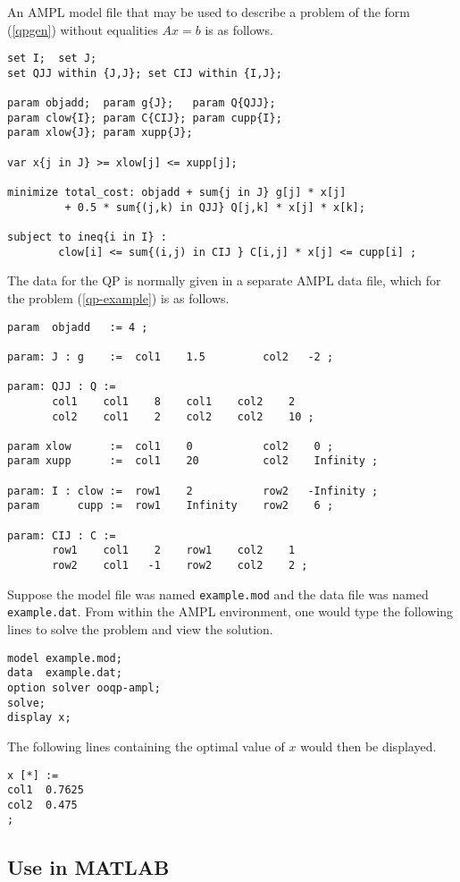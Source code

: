 An AMPL model file that may be used to describe a problem of the form
(\ref{qpgen}) without equalities $Ax=b$ is as follows.
\begin{verbatim}
set I;  set J;
set QJJ within {J,J}; set CIJ within {I,J};

param objadd;  param g{J};   param Q{QJJ};
param clow{I}; param C{CIJ}; param cupp{I};
param xlow{J}; param xupp{J};

var x{j in J} >= xlow[j] <= xupp[j];

minimize total_cost: objadd + sum{j in J} g[j] * x[j] 
         + 0.5 * sum{(j,k) in QJJ} Q[j,k] * x[j] * x[k];

subject to ineq{i in I} :
        clow[i] <= sum{(i,j) in CIJ } C[i,j] * x[j] <= cupp[i] ;
\end{verbatim}
The data for the QP is normally given in a separate AMPL data file,
which for the problem (\ref{qp-example}) is as follows.
\begin{verbatim}
param  objadd   := 4 ;

param: J : g    :=  col1    1.5         col2   -2 ;

param: QJJ : Q := 
       col1    col1    8    col1    col2    2
       col2    col1    2    col2    col2    10 ;

param xlow      :=  col1    0           col2    0 ;
param xupp      :=  col1    20          col2    Infinity ;

param: I : clow :=  row1    2           row2   -Infinity ;  
param      cupp :=  row1    Infinity    row2    6 ;      
      
param: CIJ : C := 
       row1    col1    2    row1    col2    1
       row2    col1   -1    row2    col2    2 ;
\end{verbatim}
Suppose the model file was named \texttt{example.mod} and the data
file was named \texttt{example.dat}. From within the AMPL environment,
one would type the following lines to solve the problem and view the
solution.
\begin{verbatim}
model example.mod;
data  example.dat;
option solver ooqp-ampl;
solve;
display x;                                                                
\end{verbatim}
The following lines containing the optimal value of $x$ would then be
displayed.
\begin{verbatim}
x [*] :=
col1  0.7625
col2  0.475
;
\end{verbatim}
                                                     
\subsection{Use in MATLAB}
\label{sec.use-in-matlab}

